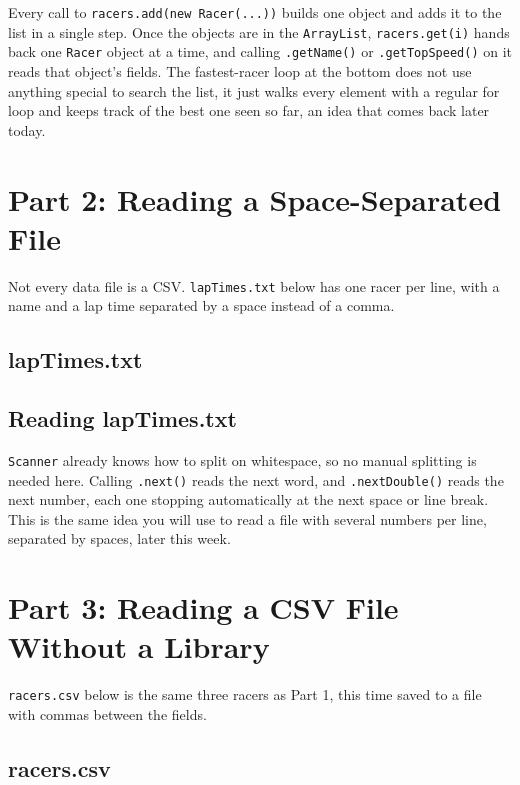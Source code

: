 \documentclass[11pt]{article}
\begin{document}
Every call to \texttt{racers.add(new Racer(...))} builds one object
and adds it to the list in a single step. Once the objects are in the
\texttt{ArrayList}, \texttt{racers.get(i)} hands back one
\texttt{Racer} object at a time, and calling \texttt{.getName()} or
\texttt{.getTopSpeed()} on it reads that object's fields. The
fastest-racer loop at the bottom does not use anything special to
search the list, it just walks every element with a regular for loop
and keeps track of the best one seen so far, an idea that comes back
later today.

\section{Part 2: Reading a Space-Separated File}

Not every data file is a CSV. \texttt{lapTimes.txt} below has one
racer per line, with a name and a lap time separated by a space
instead of a comma.

\subsection{lapTimes.txt}



\subsection{Reading lapTimes.txt}



\texttt{Scanner} already knows how to split on whitespace, so no
manual splitting is needed here. Calling \texttt{.next()} reads the
next word, and \texttt{.nextDouble()} reads the next number, each one
stopping automatically at the next space or line break. This is the
same idea you will use to read a file with several numbers per line,
separated by spaces, later this week.

\section{Part 3: Reading a CSV File Without a Library}

\texttt{racers.csv} below is the same three racers as Part 1, this
time saved to a file with commas between the fields.

\subsection{racers.csv}
\end{document}

